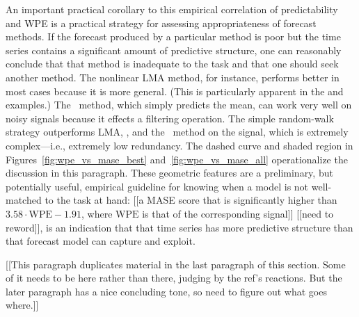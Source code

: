 
An important practical corollary to this empirical correlation of
predictability and WPE is a practical strategy for assessing
appropriateness of forecast methods.  If the forecast produced by a
particular method is poor but the time series contains a significant
amount of predictive structure, one can reasonably conclude that that
method is inadequate to the task and that one should seek another
method.  The nonlinear LMA method, for instance, performs better in
most cases because it is more general.  (This is particularly apparent
in the \col and \svdfive examples.)
The \naive ~method, which simply predicts the mean, can work very well
on noisy signals because it effects a filtering operation.  The simple
random-walk strategy outperforms LMA, \arima, and the \naive
~method on the \gcc signal, which is extremely complex---i.e.,
extremely low redundancy.
The dashed curve and shaded region in
Figures~\ref{fig:wpe_vs_mase_best} and~\ref{fig:wpe_vs_mase_all}
operationalize the discussion in this paragraph.  These geometric
features are a preliminary, but potentially useful, empirical
guideline for knowing when a model is not well-matched to the task at
hand: [[a MASE score that is significantly higher than $3.58 \cdot
    \mathrm{WPE} - 1.91$, where $\mathrm{WPE}$ is that of the
    corresponding signal]] [[need to reword]], is an indication that
that time series has more predictive structure than that forecast
model can capture and exploit.

[[This paragraph duplicates material in the last paragraph of this
    section.  Some of it needs to be here rather than there, judging
    by the ref's reactions.  But the later paragraph has a nice
    concluding tone, so need to figure out what goes where.]]

